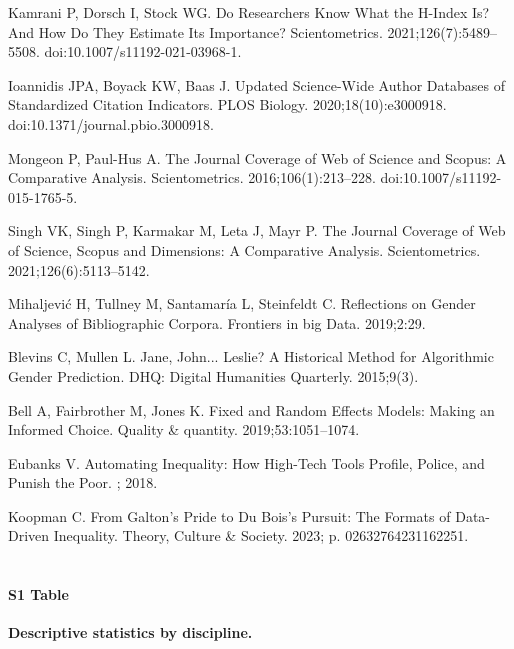 \documentclass[
  10pt,
  letterpaper,
]{article}
\providecommand{\DIFaddtex}[1]{{\protect\color{blue}\uwave{#1}}} %
\providecommand{\DIFaddbegin}{} %
\providecommand{\DIFaddend}{} %
\providecommand{\DIFdelbegin}{} %
\providecommand{\DIFdelend}{} %
\providecommand{\DIFadd}[1]{\texorpdfstring{\DIFaddtex{#1}}{#1}} %
\newcommand{\DIFscaledelfig}{0.5}
\newlength{\DIFdelgraphicswidth} %
\newlength{\DIFdelgraphicsheight} %
\newcommand{\DIFaddincludegraphics}[2][]{{\color{blue}\fbox{\DIFOincludegraphics[#1]{#2}}}} %
\newcommand{\DIFdelincludegraphics}[2][]{%
\sbox{\DIFdelgraphicsbox}{\DIFOincludegraphics[#1]{#2}}%
\settoboxwidth{\DIFdelgraphicswidth}{\DIFdelgraphicsbox} %
\settoboxtotalheight{\DIFdelgraphicsheight}{\DIFdelgraphicsbox} %
\scalebox{\DIFscaledelfig}{%
\parbox[b]{\DIFdelgraphicswidth}{\usebox{\DIFdelgraphicsbox}\\[-\baselineskip] \rule{\DIFdelgraphicswidth}{0em}}\llap{\resizebox{\DIFdelgraphicswidth}{\DIFdelgraphicsheight}{%
\setlength{\unitlength}{\DIFdelgraphicswidth}%
\begin{picture}(1,1)%
\thicklines\linethickness{2pt} %
{\color[rgb]{1,0,0}\put(0,0){\framebox(1,1){}}}%
{\color[rgb]{1,0,0}\put(0,0){\line( 1,1){1}}}%
{\color[rgb]{1,0,0}\put(0,1){\line(1,-1){1}}}%
\end{picture}%
}\hspace*{3pt}}} %
} %
\DeclareRobustCommand{\DIFaddbegin}{\DIFOaddbegin \let\includegraphics\DIFaddincludegraphics} %
\DeclareRobustCommand{\DIFaddend}{\DIFOaddend \let\includegraphics\DIFOincludegraphics} %
\DeclareRobustCommand{\DIFdelbegin}{\DIFOdelbegin \let\includegraphics\DIFdelincludegraphics} %
\DeclareRobustCommand{\DIFdelend}{\DIFOaddend \let\includegraphics\DIFOincludegraphics} %
\begin{document}
\begin{thebibliography}{10}
Kamrani P, Dorsch I, Stock WG.
\newblock Do Researchers Know What the H-Index Is? {{And}} How Do They Estimate Its Importance?
\newblock Scientometrics. 2021;126(7):5489--5508.
\newblock doi:{10.1007/s11192-021-03968-1}.

Ioannidis JPA, Boyack KW, Baas J.
\newblock Updated Science-Wide Author Databases of Standardized Citation Indicators.
\newblock PLOS Biology. 2020;18(10):e3000918.
\newblock doi:{10.1371/journal.pbio.3000918}.

Mongeon P, {Paul-Hus} A.
\newblock The Journal Coverage of {{Web}} of {{Science}} and {{Scopus}}: A Comparative Analysis.
\newblock Scientometrics. 2016;106(1):213--228.
\newblock doi:{10.1007/s11192-015-1765-5}.

Singh VK, Singh P, Karmakar M, Leta J, Mayr P.
\newblock The Journal Coverage of {{Web}} of {{Science}}, {{Scopus}} and {{Dimensions}}: {{A}} Comparative Analysis.
\newblock Scientometrics. 2021;126(6):5113--5142.

Mihaljevi{\'c} H, Tullney M, Santamar{\'i}a L, Steinfeldt C.
\newblock Reflections on Gender Analyses of Bibliographic Corpora.
\newblock Frontiers in big Data. 2019;2:29.

Blevins C, Mullen L.
\newblock Jane, {{John}}... {{Leslie}}? {{A Historical Method}} for {{Algorithmic Gender Prediction}}.
\newblock DHQ: Digital Humanities Quarterly. 2015;9(3).

Bell A, Fairbrother M, Jones K.
\newblock Fixed and Random Effects Models: Making an Informed Choice.
\newblock Quality \& quantity. 2019;53:1051--1074.

Eubanks V.
\newblock Automating Inequality: {{How}} High-Tech Tools Profile, Police, and Punish the Poor.
; 2018.

Koopman C.
\newblock From {{Galton}}'s {{Pride}} to {{Du Bois}}'s {{Pursuit}}: {{The Formats}} of {{Data-Driven Inequality}}.
\newblock Theory, Culture \& Society. 2023; p. 02632764231162251.

\end{thebibliography}

\DIFdelbegin %
\DIFdelend \DIFaddbegin \section{\DIFadd{Supporting Information}}\label{supporting-information}
\DIFaddend 

\paragraph*{S1 Table}
\label{id}
{\textbf{Descriptive statistics by discipline.}}


\nolinenumbers
\end{document}
